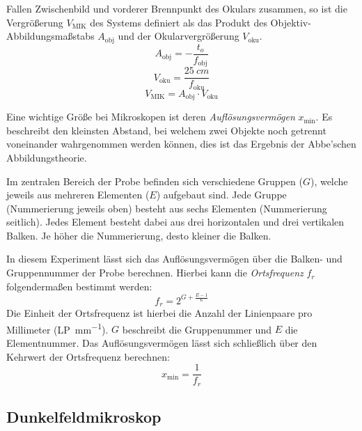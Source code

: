 \documentclass[ngerman]{scrartcl}
\begin{document}
Fallen Zwischenbild und vorderer Brennpunkt des Okulars zusammen, so ist die Vergrößerung $V_{\text{MIK}}$ des Systems definiert als das Produkt des Objektiv-Abbildungsmaßstabs $A_{\text{obj}}$ und der Okularvergrößerung $V_{\text{oku}}$.
%
\begin{equation}
    \label{eq:objektivabbildungsmaszstab}
    A_{\text{obj}} = -\frac{t_o}{f_{\text{obj}}}
\end{equation}
\begin{equation}
    \label{eq:okularvergroeszerung}
    V_{\text{oku}} = \frac{\SI{25}{cm}}{f_{\text{oku}}}
\end{equation}
\begin{equation}
    \label{eq:gesamtvergroesserung}
    V_{\text{MIK}} = A_{\text{obj}} \cdot V_{\text{oku}}
\end{equation}

Eine wichtige Größe bei Mikroskopen ist deren \textit{Auflösungsvermögen} $x_\text{min}$. Es beschreibt den kleinsten Abstand, bei welchem zwei Objekte noch getrennt voneinander wahrgenommen werden können, dies ist das Ergebnis der Abbe'schen Abbildungstheorie.

Im zentralen Bereich der Probe befinden sich verschiedene Gruppen ($G$), welche jeweils aus mehreren Elementen ($E$) aufgebaut sind. Jede Gruppe (Nummerierung jeweils oben) besteht aus sechs Elementen (Nummerierung seitlich). Jedes Element besteht dabei aus drei horizontalen und drei vertikalen Balken. Je höher die Nummerierung, desto kleiner die Balken.

In diesem Experiment lässt sich das Auflösungsvermögen über die Balken- und Gruppennummer der Probe berechnen. Hierbei kann die \textit{Ortsfrequenz} $f_r$ folgendermaßen bestimmt werden:
%
\begin{equation}
    \label{eq:ortsfrequenz}
    f_r = 2^{G+\frac{E-1}{6}}
\end{equation}
%
Die Einheit der Ortsfrequenz ist hierbei die Anzahl der Linienpaare pro Millimeter (\si{LP\per\milli\meter}). $G$ beschreibt die Gruppenummer und $E$ die Elementnummer. Das Auflösungsvermögen lässt sich schließlich über den Kehrwert der Ortsfrequenz berechnen:
%
\begin{equation}
    \label{eq:aufloesungsvermoegen}
    x_\text{min} = \frac{1}{f_r}
\end{equation}


\subsection{Dunkelfeldmikroskop}
\label{subsec:dunkelfeldmikroskop_grundlagen}
\end{document}
